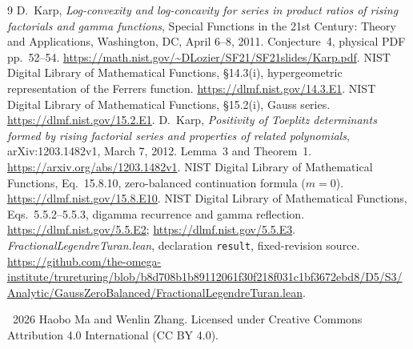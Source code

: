 \documentclass[11pt]{article}
\begin{document}
\begingroup
\raggedright
\begin{thebibliography}{9}
 D.~Karp,
\emph{Log-convexity and log-concavity for series in product ratios of
rising factorials and gamma functions}, Special Functions in the 21st
Century: Theory and Applications, Washington, DC, April 6--8, 2011.
Conjecture~4, physical PDF pp.~52--54.
\url{https://math.nist.gov/~DLozier/SF21/SF21slides/Karp.pdf}.
 NIST Digital Library of Mathematical Functions,
\S14.3(i), hypergeometric representation of the Ferrers function.
\url{https://dlmf.nist.gov/14.3.E1}.
 NIST Digital Library of Mathematical Functions,
\S15.2(i), Gauss series.
\url{https://dlmf.nist.gov/15.2.E1}.
 D.~Karp,
\emph{Positivity of Toeplitz determinants formed by rising factorial
series and properties of related polynomials}, arXiv:1203.1482v1,
March 7, 2012. Lemma~3 and Theorem~1.
\url{https://arxiv.org/abs/1203.1482v1}.
 NIST Digital Library of Mathematical Functions,
Eq.~15.8.10, zero-balanced continuation formula ($m=0$).
\url{https://dlmf.nist.gov/15.8.E10}.
 NIST Digital Library of Mathematical Functions,
Eqs.~5.5.2--5.5.3, digamma recurrence and gamma reflection.
\url{https://dlmf.nist.gov/5.5.E2};
\url{https://dlmf.nist.gov/5.5.E3}.
 \emph{FractionalLegendreTuran.lean}, declaration
\texttt{result}, fixed-revision source.
\url{https://github.com/the-omega-institute/trureturing/blob/b8d708b1b89112061f30f218f031c1bf3672ebd8/D5/S3/Analytic/GaussZeroBalanced/FractionalLegendreTuran.lean}.
\end{thebibliography}
\endgroup
\smallskip
\noindent\small\textcopyright\ 2026 Haobo Ma and Wenlin Zhang.
Licensed under Creative Commons Attribution 4.0 International (CC BY 4.0).
\end{document}
